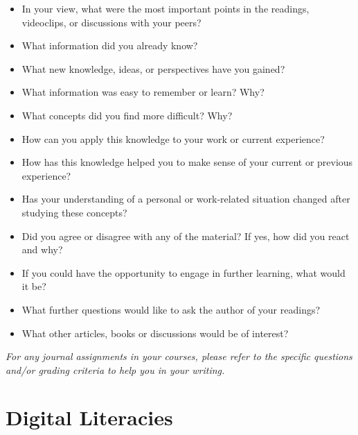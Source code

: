 \documentclass[
]{book}
\providecommand{\tightlist}{%
  \setlength{\itemsep}{0pt}\setlength{\parskip}{0pt}}
\theoremstyle{definition}
\theoremstyle{definition}
\theoremstyle{definition}
\theoremstyle{definition}
\theoremstyle{remark}
\begin{document}
\begin{reflect}
\begin{itemize}
\tightlist
\item
  In your view, what were the most important points in the readings, videoclips, or discussions with your peers?\\
\item
  What information did you already know?\\
\item
  What new knowledge, ideas, or perspectives have you gained?\\
\item
  What information was easy to remember or learn? Why?\\
\item
  What concepts did you find more difficult? Why?\\
\item
  How can you apply this knowledge to your work or current experience?\\
\item
  How has this knowledge helped you to make sense of your current or previous experience?\\
\item
  Has your understanding of a personal or work-related situation changed after studying these concepts?\\
\item
  Did you agree or disagree with any of the material? If yes, how did you react and why?\\
\item
  If you could have the opportunity to engage in further learning, what would it be?\\
\item
  What further questions would like to ask the author of your readings?\\
\item
  What other articles, books or discussions would be of interest?
\end{itemize}

\emph{For any journal assignments in your courses, please refer to the specific questions and/or grading
criteria to help you in your writing.}
\end{reflect}

\hypertarget{digital-literacies-1}{%
\section{Digital Literacies}\label{digital-literacies-1}}
\end{document}
